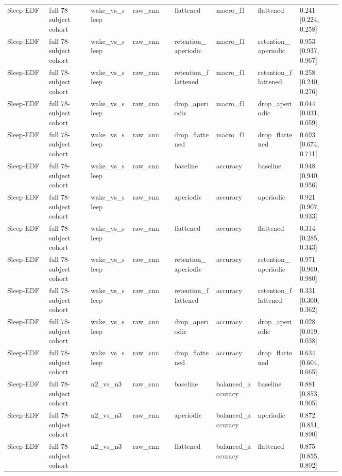 \begin{longtable}{p{0.10\linewidth}p{0.10\linewidth}p{0.10\linewidth}p{0.10\linewidth}p{0.10\linewidth}p{0.10\linewidth}p{0.10\linewidth}p{0.10\linewidth}}
Sleep-EDF & full 78-subject cohort & wake\_vs\_sleep & raw\_cnn & flattened & macro\_f1 & flattened & 0.241 [0.224, 0.258]\\
Sleep-EDF & full 78-subject cohort & wake\_vs\_sleep & raw\_cnn & retention\_aperiodic & macro\_f1 & retention\_aperiodic & 0.953 [0.937, 0.967]\\
Sleep-EDF & full 78-subject cohort & wake\_vs\_sleep & raw\_cnn & retention\_flattened & macro\_f1 & retention\_flattened & 0.258 [0.240, 0.276]\\
Sleep-EDF & full 78-subject cohort & wake\_vs\_sleep & raw\_cnn & drop\_aperiodic & macro\_f1 & drop\_aperiodic & 0.044 [0.031, 0.059]\\
Sleep-EDF & full 78-subject cohort & wake\_vs\_sleep & raw\_cnn & drop\_flattened & macro\_f1 & drop\_flattened & 0.693 [0.674, 0.711]\\
Sleep-EDF & full 78-subject cohort & wake\_vs\_sleep & raw\_cnn & baseline & accuracy & baseline & 0.948 [0.940, 0.956]\\
Sleep-EDF & full 78-subject cohort & wake\_vs\_sleep & raw\_cnn & aperiodic & accuracy & aperiodic & 0.921 [0.907, 0.933]\\
Sleep-EDF & full 78-subject cohort & wake\_vs\_sleep & raw\_cnn & flattened & accuracy & flattened & 0.314 [0.285, 0.343]\\
Sleep-EDF & full 78-subject cohort & wake\_vs\_sleep & raw\_cnn & retention\_aperiodic & accuracy & retention\_aperiodic & 0.971 [0.960, 0.980]\\
Sleep-EDF & full 78-subject cohort & wake\_vs\_sleep & raw\_cnn & retention\_flattened & accuracy & retention\_flattened & 0.331 [0.300, 0.362]\\
Sleep-EDF & full 78-subject cohort & wake\_vs\_sleep & raw\_cnn & drop\_aperiodic & accuracy & drop\_aperiodic & 0.028 [0.019, 0.038]\\
Sleep-EDF & full 78-subject cohort & wake\_vs\_sleep & raw\_cnn & drop\_flattened & accuracy & drop\_flattened & 0.634 [0.604, 0.665]\\
Sleep-EDF & full 78-subject cohort & n2\_vs\_n3 & raw\_cnn & baseline & balanced\_accuracy & baseline & 0.881 [0.853, 0.905]\\
Sleep-EDF & full 78-subject cohort & n2\_vs\_n3 & raw\_cnn & aperiodic & balanced\_accuracy & aperiodic & 0.872 [0.851, 0.890]\\
Sleep-EDF & full 78-subject cohort & n2\_vs\_n3 & raw\_cnn & flattened & balanced\_accuracy & flattened & 0.875 [0.855, 0.892]\\

\end{longtable}
